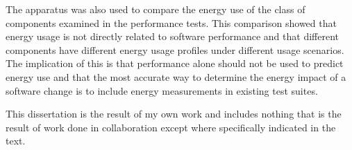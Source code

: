 The apparatus was also used to compare the energy use of the class of components examined in the performance tests. This comparison showed that energy usage is not directly related to software performance and that different components have different energy usage profiles under different usage scenarios. The implication of this is that performance alone should not be used to predict energy use and that the most accurate way to determine the energy impact of a software change is to include energy measurements in existing test suites.

This dissertation is the result of my own work and includes nothing that is the result of work done in collaboration except where specifically indicated in the text.